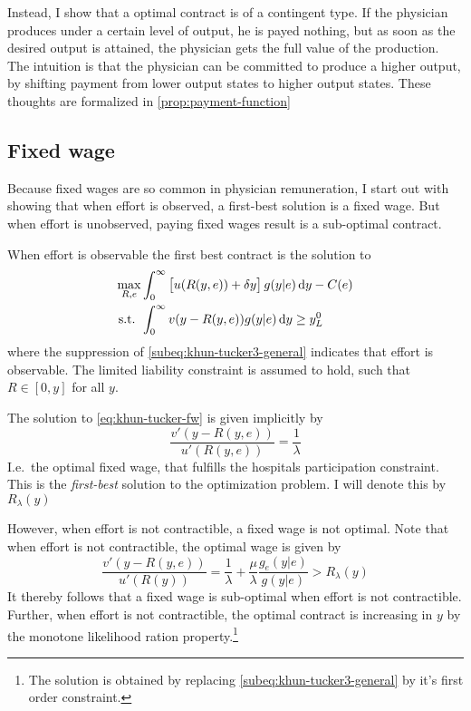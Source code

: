 Instead, I show that a optimal contract is of a contingent type. If the physician produces under a certain level of output, he is payed nothing, but as soon as the desired output is attained, the physician gets the full value of the production. The intuition is that the physician can be committed to produce a higher output, by shifting payment from lower output states to higher output states. These thoughts are formalized in \cref{prop:payment-function}

\subsection{Fixed wage} %
\label{sub:fixed_wage}
Because fixed wages are so common in physician remuneration, I start out with showing that when effort is observed, a first-best solution is a fixed wage. But when effort is unobserved, paying fixed wages result is a sub-optimal contract. 

When effort is observable the first best contract is the solution to 
\begin{subequations}
\label{eq:khun-tucker-fw}
\begin{align}
    \max_{R,e} & \int_0^{\infty}\left[u(R(y,e))+\delta y\right]g(y|e)\dif y-C(e) \\
    \text{s.t. }    & \int_{0}^{\infty} v(y-R(y,e))g(y|e)\dif y\geq y_L^0
\end{align}
\end{subequations}
where the suppression of \cref{subeq:khun-tucker3-general} indicates that effort is observable. The limited liability constraint is assumed to hold, such that  $R\in[0,y]$ for all $y$. 

The solution to \cref{eq:khun-tucker-fw} is given implicitly by 
\[
    \frac{v'(y-R(y,e))}{u'(R(y,e))}=\frac{1}{\lambda}
\]
I.e.\ the optimal fixed wage, that fulfills the hospitals participation constraint. This is the \emph{first-best} solution to the optimization problem. I will denote this by $R_\lambda(y)$

However, when effort is not contractible, a fixed wage is not optimal. Note that when effort is not contractible, the optimal wage is given by 
\[
    \frac{v'(y-R(y,e))}{u'(R(y))}=\frac{1}{\lambda}+\frac{\mu}{\lambda}\frac{g_e(y|e)}{g(y|e)}>R_\lambda(y)
\]
It thereby follows that a fixed wage is sub-optimal when effort is not contractible. Further, when effort is not contractible, the optimal contract is increasing in $y$ by the monotone likelihood ration property.\footnote{The solution is obtained by replacing \cref{subeq:khun-tucker3-general} by it's first order constraint.}


